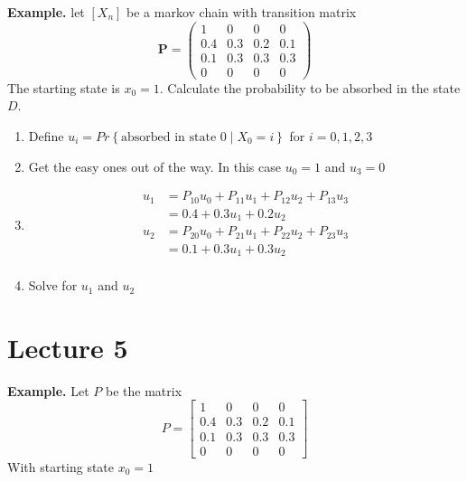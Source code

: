\documentclass{article}
\theoremstyle{remark}
\begin{document}
     \begin{tcolorbox}
       \textbf{Example.} let $\left[ X_{n} \right]$ be a markov chain with transition matrix \[
       \mathbf{P} = \begin{pmatrix}
       1  &  0 &  0  &  0 \\
       0.4  &  0.3  &  0.2  &  0.1 \\
       0.1  &  0.3  &  0.3 &  0.3 \\
       0  &  0 &  0 &  0 
       \end{pmatrix} 
       \] 
       The starting state is $x_{0} = 1$. Calculate the probability to be absorbed in the state $D$.
       \begin{enumerate}
         \item Define $u_{i} = Pr \left \{ \text{absorbed in state 0}  \mid  X _{0} = i \right \} $ for $i = 0,1,2,3$ 
         \item Get the easy ones out of the way. In this case $u_{0} = 1$ and $u_{3} = 0$
         \item 
           \[
           \begin{split}
            u_{1}  &  = P_{10} u_{0} + P_{11} u_{1} + P_{12} u_{2} + P_{13}u_{3}  \\
            &= 0.4 + 0.3 u_{1} + 0.2 u_{2}  \\
            u_{2} &= P_{20} u_{0} + P_{21} u_{1} + P_{22} u_{2} + P_{23} u_{3} \\
            &= 0.1 + 0.3 u_{1} + 0.3 u _{2} \\
           \end{split} 
           \] 
         \item Solve for $u_{1}$ and $u_{2}$
       \end{enumerate}
     \end{tcolorbox}
 
\newpage
\section{Lecture 5}%
\label{sec:lecture_5}

\textbf{Example.} Let $P$ be the matrix \[
P = \begin{bmatrix} 
1  & 0  &  0 &  0 \\
0.4  &  0.3  &  0.2  &  0.1 \\
0.1   &  0.3  &  0.3  &  0.3 \\
0  &  0  &  0 &  0
\end{bmatrix} 
\] 
With starting state $x_{0} = 1$
\end{document}
